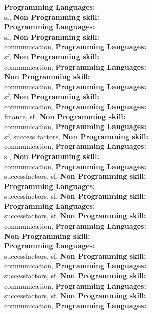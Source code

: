 \textbf{Programming Languages:} \\
sf, \textbf{Non Programming skill:} \\
\textbf{Programming Languages:} \\
sf, \textbf{Non Programming skill:} \\
communication, \textbf{Programming Languages:} \\
sf, \textbf{Non Programming skill:} \\
communication, \textbf{Programming Languages:} \\
\textbf{Non Programming skill:} \\
communication, \textbf{Programming Languages:} \\
sf, \textbf{Non Programming skill:} \\
communication, \textbf{Programming Languages:} \\
finance, sf, \textbf{Non Programming skill:} \\
communication, \textbf{Programming Languages:} \\
sf, success factors, \textbf{Non Programming skill:} \\
communication, \textbf{Programming Languages:} \\
sf, \textbf{Non Programming skill:} \\
communication, \textbf{Programming Languages:} \\
successfactors, sf, \textbf{Non Programming skill:} \\
\textbf{Programming Languages:} \\
successfactors, sf, \textbf{Non Programming skill:} \\
\textbf{Programming Languages:} \\
successfactors, sf, \textbf{Non Programming skill:} \\
communication, \textbf{Programming Languages:} \\
\textbf{Non Programming skill:} \\
\textbf{Programming Languages:} \\
successfactors, sf, \textbf{Non Programming skill:} \\
communication, \textbf{Programming Languages:} \\
successfactors, sf, \textbf{Non Programming skill:} \\
communication, \textbf{Programming Languages:} \\
successfactors, sf, \textbf{Non Programming skill:} \\
communication, \textbf{Programming Languages:} \\
